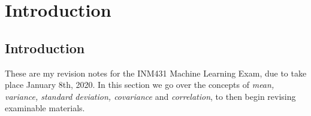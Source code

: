 
\chapter{Introduction}

\section*{Introduction}
These are my revision notes for the INM431 Machine Learning Exam, due to take place January 8th, 2020.
In this section we go over the concepts of \textit{mean, variance, standard deviation, covariance} and \textit{correlation}, to then begin revising examinable materials.















